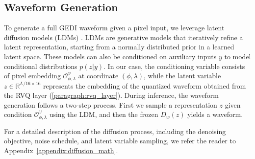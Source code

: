 \subsection{Waveform Generation} \label{sec:diffusion}

To generate a full GEDI waveform given a pixel input, we leverage latent diffusion models (LDMs) \cite{rombach2022sd}. LDMs are generative models that iteratively refine a latent representation, starting from a normally distributed prior in a learned latent space. These models can also be conditioned on auxiliary inputs $y$ to model conditional distributions $p(z|y)$. In our case, the conditioning variable consists of pixel embedding $\mathcal{O}^{\mathcal{V}}_{\phi,\lambda}$ at coordinate $(\phi, \lambda)$, while the latent variable $z \in \mathbb{R}^{L/16\times16}$ represents the embedding of the quantized waveform obtained from the RVQ layer (\cref{paragraph:rvq_layer}). During inference, the waveform generation follows a two-step process. First we sample a representation $z$ given condition $\mathcal{O}^{\mathcal{V}}_{\phi,\lambda}$ using the LDM, and then the frozen $D_w(z)$ yields a waveform.

For a detailed description of the diffusion process, including the denoising objective, noise schedule, and latent variable sampling, we refer the reader to Appendix~\ref{appendix:diffusion_math}.